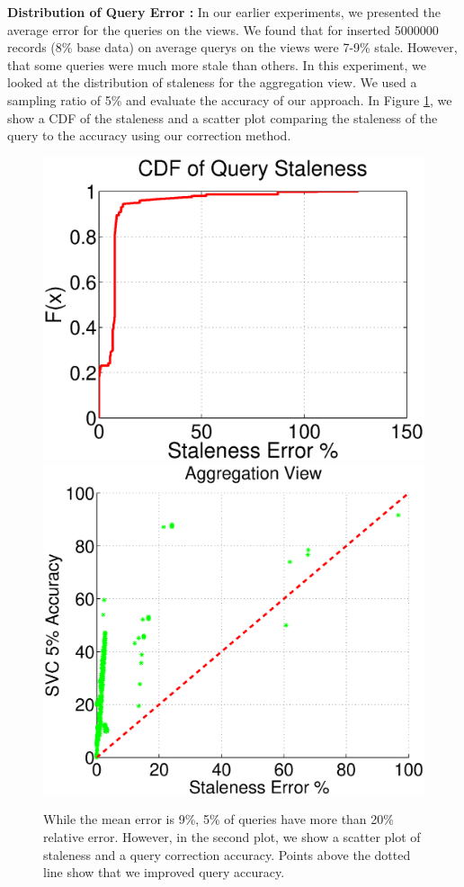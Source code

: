 {\noindent \bf Distribution of Query Error :} In our earlier experiments, we presented the average error for the queries on the views.
We found that for inserted 5000000 records (8\% base data) on average querys on the views were 7-9\% stale. 
However, that some queries were much more stale than others.
In this experiment, we looked at the distribution of staleness for the aggregation view.
We used a sampling ratio of 5\% and evaluate the accuracy of our approach. 
In Figure \ref{exp3dist}, we show a CDF of the staleness and a scatter plot comparing the staleness of the query to the accuracy using our correction method.

\begin{figure}[ht!]
\centering
 \includegraphics[scale=0.22]{exp/query_error_dist.eps}
 \includegraphics[scale=0.19]{exp/query_error_dist2.eps}
 \caption{While the mean error is 9\%, 5\% of queries have more than 20\% relative error. However, in the second plot, we show a scatter plot of staleness and a query correction accuracy. Points above the dotted line show that we improved query accuracy.\label{exp3dist}}
\end{figure}

